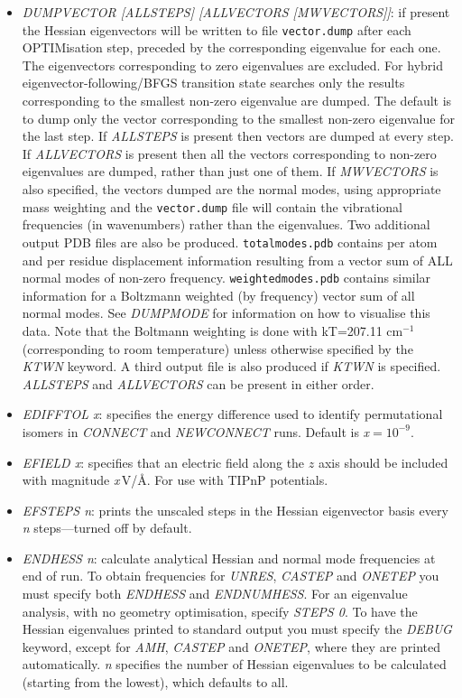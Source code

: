 \documentclass[12pt,a4paper,dvips]{article}
\begin{document}
\begin{itemize}
\item {\it DUMPVECTOR [ALLSTEPS] [ALLVECTORS [MWVECTORS]]}: if present the Hessian eigenvectors 
will be written to file {\tt vector.dump} after each OPTIMisation step,
preceded by the corresponding eigenvalue for each one. The
eigenvectors corresponding to zero eigenvalues are excluded. For hybrid eigenvector-following/BFGS
transition state searches only the results corresponding to the smallest non-zero
eigenvalue are dumped. The default is to dump only the vector corresponding
to the smallest non-zero eigenvalue for the last step. If {\it ALLSTEPS\/} is
present then vectors are dumped at every step. If {\it ALLVECTORS\/} is present
then all the vectors corresponding to non-zero eigenvalues are dumped, rather
than just one of them. If {\it MWVECTORS\/} is also specified, the vectors dumped are the normal modes, 
using appropriate mass weighting and the {\tt vector.dump} file will contain the vibrational frequencies (in wavenumbers) rather than the eigenvalues. Two additional output PDB files are also be produced. {\tt totalmodes.pdb} contains per atom and per residue displacement information resulting from a vector sum of ALL normal modes of non-zero frequency. {\tt weightedmodes.pdb} contains similar information for a Boltzmann weighted (by frequency) vector sum of all normal modes. See {\it DUMPMODE} for information on how to visualise this data. Note that the Boltmann weighting is done with kT=207.11 cm$^{-1}$ (corresponding to room temperature) unless otherwise specified by the {\it KTWN} keyword. A third output file is also produced if {\it KTWN} is specified. {\it ALLSTEPS\/} and {\it ALLVECTORS\/} can be present in
either order. 

\item {\it EDIFFTOL x\/}: specifies the energy difference used to identify permutational isomers
in {\it CONNECT\/} and {\it NEWCONNECT\/} runs. Default is {\it x}$=10^{-9}$.

\item {\it EFIELD x\/}: specifies that an electric field along the $z$ axis
should be included with magnitude {\it x}\,V/\AA. For use with TIPnP potentials.

\item {\it EFSTEPS n\/}: prints the unscaled steps in the Hessian
eigenvector basis every {\it n\/} steps---turned off by default.

\item {\it ENDHESS n\/}: calculate analytical Hessian and normal mode
frequencies at end of run. To obtain frequencies for {\it UNRES\/},
{\it CASTEP\/} and {\it ONETEP} you must
specify both {\it ENDHESS\/} and {\it ENDNUMHESS\/}.
For an eigenvalue analysis, with no geometry optimisation, specify {\it STEPS 0\/}.
To have the Hessian eigenvalues printed to standard output you must specify the 
{\it DEBUG\/} keyword, except for {\it AMH\/}, {\it CASTEP\/} and {\it ONETEP\/}, where they are printed
automatically. {\it n\/} specifies the number of Hessian eigenvalues to be calculated 
(starting from the lowest), which defaults to all.


\end{itemize}
\end{document}
